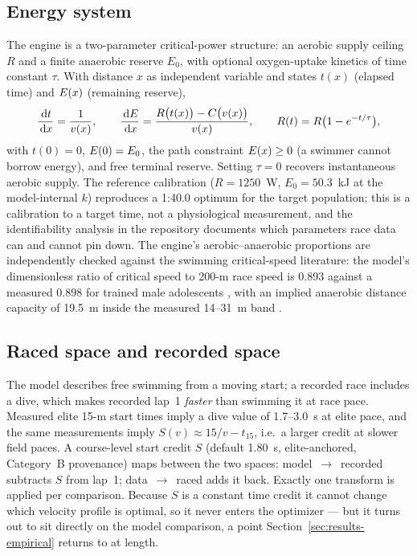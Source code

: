 \subsection{Energy system}

The engine is a two-parameter critical-power structure: an aerobic supply
ceiling $R$ and a finite anaerobic reserve $E_0$, with optional oxygen-uptake
kinetics of time constant $\tau$. With distance $x$ as independent variable
and states $t(x)$ (elapsed time) and $E(x)$ (remaining reserve),
\begin{equation}
  \frac{\,\mathrm{d} t}{\,\mathrm{d} x} = \frac{1}{v(x)}, \qquad
  \frac{\,\mathrm{d} E}{\,\mathrm{d} x} = \frac{R\big(t(x)\big) - C\big(v(x)\big)}{v(x)},
  \qquad
  R(t) = R\big(1 - e^{-t/\tau}\big),
  \label{eq:dynamics}
\end{equation}
with $t(0)=0$, $E(0)=E_0$, the path constraint $E(x) \ge 0$ (a
swimmer cannot borrow energy), and free terminal reserve. Setting $\tau = 0$
recovers instantaneous aerobic supply. The reference calibration
($R = 1250$~W, $E_0 = 50.3$~kJ at the model-internal $k$) reproduces a
1:40.0 optimum for the target population; this is a calibration to a target
time, not a physiological measurement, and the identifiability analysis in
the repository documents which parameters race data can and cannot pin down.
The engine's aerobic--anaerobic proportions are independently checked against
the swimming critical-speed literature: the model's dimensionless ratio of
critical speed to 200-m race speed is 0.893 against a measured 0.898 for
trained male adolescents \citep{nikitakis2019cs}, with an implied anaerobic
distance capacity of 19.5~m inside the measured 14--31~m band
\citep{zacca2010critical, machado2009cv}.

\subsection{Raced space and recorded space}

The model describes free swimming from a moving start; a recorded race
includes a dive, which makes recorded lap~1 \emph{faster} than swimming it at
race pace. Measured elite 15-m start times imply a dive value of
1.7--3.0~s at elite pace, and the same measurements imply
$S(v) \approx 15/v - t_{15}$, i.e.\ a larger credit at slower field paces. A
course-level start credit $S$ (default 1.80~s, elite-anchored, Category~B
provenance) maps between the two spaces: model~$\to$~recorded subtracts $S$
from lap~1; data~$\to$~raced adds it back. Exactly one transform is applied
per comparison. Because $S$ is a constant time credit it cannot change which
velocity profile is optimal, so it never enters the optimizer --- but it
turns out to sit directly on the model comparison, a point
Section~\ref{sec:results-empirical} returns to at length.
